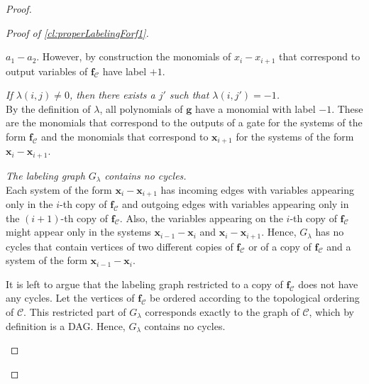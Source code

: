 \documentclass[10pt,a4paper]{article}
\theoremstyle{definition}
\theoremstyle{remark}
\newcommand{\calC}{\mathcal{C}}
\newcommand{\vecf}{\ensuremath{\boldsymbol{f}}}
\newcommand{\vecg}{\ensuremath{\boldsymbol{g}}}
\newcommand{\vecx}{\ensuremath{\boldsymbol{x}}}
\begin{document}
\begin{proof}
\begin{proof}[Proof of \autoref{cl:properLabelingForf1}]
\begin{description}
              $a_1 - a_2$. However, by construction the monomials of $x_i - x_{i+1}$ that
              correspond to output variables of $\vecf_{\calC}$ have label $+1$.
        \item[Condition 5.] \emph{If $\lambda(i, j) \neq 0$, then there exists a $j'$ such
              that $\lambda(i, j') = -1$.} \\
              By the definition of $\lambda$, all polynomials of $\vecg$ have a monomial
              with label $-1$. These are the monomials that correspond to the outputs of
              a gate for the systems of the form $\vecf_{\calC}$ and the monomials
              that correspond to $\vecx_{i+1}$ for the systems of the form
              $\vecx_{i}- \vecx_{i+1}$.
        \item[Condition 6.] \emph{The labeling graph $G_{\lambda}$ contains no cycles.}\\
              Each system of the form $\vecx_i - \vecx_{i+1}$ has incoming
              edges with variables appearing only in the $i$-th copy of
              $\vecf_{\calC}$ and outgoing edges with variables
              appearing only in the $(i+1)$-th copy of $\vecf_{\calC}$. Also, the
              variables appearing on the $i$-th copy of $\vecf_{\calC}$ might
              appear only in the systems $\vecx_{i-1} - \vecx_i$ and
              $\vecx_i - \vecx_{i+1}$. Hence, $G_{\lambda}$ has no cycles that contain
              vertices of two different copies of $\vecf_{\calC}$ or of a copy of
              $\vecf_{\calC}$ and a system of the form $\vecx_{i-1} - \vecx_i$.

              It is left to argue that the labeling graph restricted to a copy of
              $\vecf_{\calC}$  does not have any cycles. Let the vertices of
              $\vecf_{\calC}$ be ordered according to the topological ordering of
              $\calC$. This restricted part of $G_{\lambda}$ corresponds exactly to
              the graph of $\calC$, which by definition is a DAG. Hence, $G_{\lambda}$
              contains no cycles.\qedhere
      \end{description}
\end{proof}


\end{proof}
\end{document}
